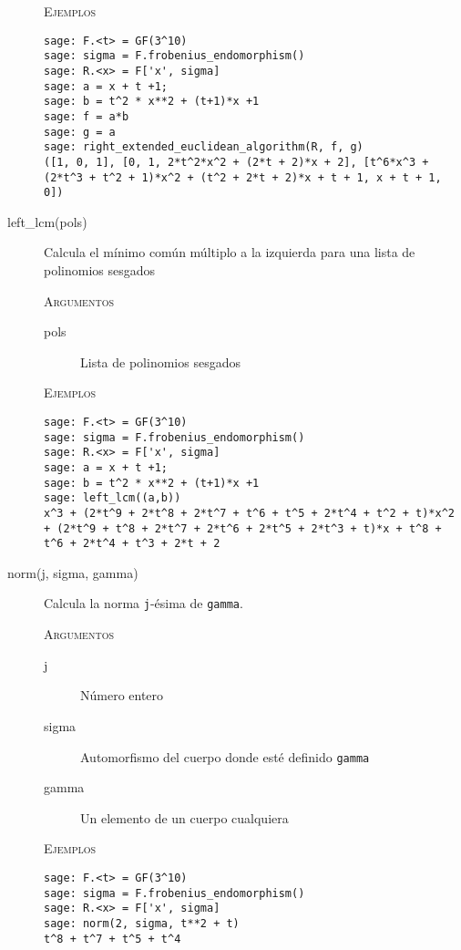 \begin{description}
    \textsc{Ejemplos}
    \begin{lstlisting}
sage: F.<t> = GF(3^10)
sage: sigma = F.frobenius_endomorphism()
sage: R.<x> = F['x', sigma]
sage: a = x + t +1;
sage: b = t^2 * x**2 + (t+1)*x +1
sage: f = a*b
sage: g = a
sage: right_extended_euclidean_algorithm(R, f, g)
([1, 0, 1], [0, 1, 2*t^2*x^2 + (2*t + 2)*x + 2], [t^6*x^3 + (2*t^3 + t^2 + 1)*x^2 + (t^2 + 2*t + 2)*x + t + 1, x + t + 1, 0])
    \end{lstlisting}

    \item[left\_lcm(pols)]
    Calcula el mínimo común múltiplo a la izquierda para una lista de polinomios sesgados

    \textsc{Argumentos}
    \begin{description}
        \item[pols] Lista de polinomios sesgados
    \end{description}

    \textsc{Ejemplos}
    \begin{lstlisting}
sage: F.<t> = GF(3^10)
sage: sigma = F.frobenius_endomorphism()
sage: R.<x> = F['x', sigma]
sage: a = x + t +1;
sage: b = t^2 * x**2 + (t+1)*x +1
sage: left_lcm((a,b))
x^3 + (2*t^9 + 2*t^8 + 2*t^7 + t^6 + t^5 + 2*t^4 + t^2 + t)*x^2 + (2*t^9 + t^8 + 2*t^7 + 2*t^6 + 2*t^5 + 2*t^3 + t)*x + t^8 + t^6 + 2*t^4 + t^3 + 2*t + 2
    \end{lstlisting}

    \item[norm(j, sigma, gamma)]
    Calcula la norma \texttt{j}-ésima de \texttt{gamma}.

    \textsc{Argumentos}
    \begin{description}
        \item[j] Número entero
        \item[sigma] Automorfismo del cuerpo donde esté definido \texttt{gamma}
        \item[gamma] Un elemento de un cuerpo cualquiera
    \end{description}

    \textsc{Ejemplos}
    \begin{lstlisting}
sage: F.<t> = GF(3^10)
sage: sigma = F.frobenius_endomorphism()
sage: R.<x> = F['x', sigma]
sage: norm(2, sigma, t**2 + t)
t^8 + t^7 + t^5 + t^4
    \end{lstlisting}

\end{description}
